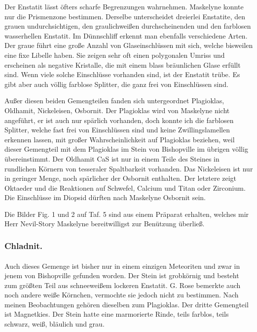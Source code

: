 \documentclass[a4paper, 12pt, oneside]{article}
\begin{document}
Der Enstatit lässt öfters scharfe Begrenzungen wahrnehmen. Maskelyne konnte nur die Prismenzone bestimmen. Derselbe unterscheidet dreierlei Enstatite, den grauen undurchsichtigen, den graulichweißen durchscheinenden und den farblosen wasserhellen Enstatit. Im Dünnschliff erkennt man ebenfalls verschiedene Arten. Der graue führt eine große Anzahl von Glaseinschlüssen mit sich, welche bisweilen eine fixe Libelle haben. Sie zeigen sehr oft einen polygonalen Umriss und erscheinen als negative Kristalle, die mit einem blass bräunlichen Glase erfüllt sind. Wenn viele solche Einschlüsse vorhanden sind, ist der Enstatit trübe. Es gibt aber auch völlig farblose Splitter, die ganz frei von Einschlüssen sind.

Außer diesen beiden Gemengteilen fanden sich untergeordnet Plagioklas, Oldhamit, Nickeleisen, Osbornit. Der Plagioklas wird von Maskelyne nicht angeführt, er ist auch nur spärlich vorhanden, doch konnte ich die farblosen Splitter, welche fast frei von Einschlüssen sind und keine Zwillingslamellen erkennen lassen, mit großer Wahrscheinlichkeit auf Plagioklas beziehen, weil dieser Gemengteil mit dem Plagioklas im Stein von Bishopville im übrigen völlig übereinstimmt. Der Oldhamit CaS ist nur in einem Teile des Steines in rundlichen Körnern von tesseraler Spaltbarkeit vorhanden. Das Nickeleisen ist nur in geringer Menge, noch spärlicher der Osbornit enthalten. Der letztere zeigt Oktaeder und die Reaktionen auf Schwefel, Calcium und Titan oder Zirconium. Die Einschlüsse im Diopsid dürften nach Maskelyne Osbornit sein.

Die Bilder Fig. 1 und 2 auf Taf. 5 sind aus einem Präparat erhalten, welches mir Herr Nevil-Story Maskelyne bereitwilligst zur Benützung überließ.

\subsubsection{Chladnit.}
\paragraph{}
Auch dieses Gemenge ist bisher nur in einem einzigen Meteoriten und zwar in jenem von Bishopville gefunden worden. Der Stein ist grobkörnig und besteht zum größten Teil aus schneeweißem lockeren Enstatit. G. Rose bemerkte auch noch andere weiße Körnchen, vermochte sie jedoch nicht zu bestimmen. Nach meinen Beobachtungen gehören dieselben zum Plagioklas. Der dritte Gemengteil ist Magnetkies. Der Stein hatte eine marmorierte Rinde, teils farblos, teils schwarz, weiß, bläulich und grau.
\end{document}
